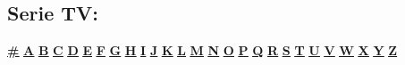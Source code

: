 \subsection [Serie TV]{\huge Serie TV:}
	
		\begin{center}
			\hyperlink{S\#}{\textbf{\underline{\#}}}
			\hyperlink{SA}{\textbf{\underline{A}}} \hyperlink{SB}{\textbf{\underline{B}}} \hyperlink{SC}{\textbf{\underline{C}}} \hyperlink{SD}{\textbf{\underline{D}}} \hyperlink{SE}{\textbf{\underline{E}}} \hyperlink{SF}{\textbf{\underline{F}}} \hyperlink{SG}{\textbf{\underline{G}}} \hyperlink{SH}{\textbf{\underline{H}}} \hyperlink{SI}{\textbf{\underline{I}}} \hyperlink{SJ}{\textbf{\underline{J}}} \hyperlink{SK}{\textbf{\underline{K}}} \hyperlink{SL}{\textbf{\underline{L}}} \hyperlink{SM}{\textbf{\underline{M}}} \hyperlink{SN}{\textbf{\underline{N}}} \hyperlink{SO}{\textbf{\underline{O}}} \hyperlink{SP}{\textbf{\underline{P}}} \hyperlink{SQ}{\textbf{\underline{Q}}} \hyperlink{SR}{\textbf{\underline{R}}} \hyperlink{SS}{\textbf{\underline{S}}} \hyperlink{ST}{\textbf{\underline{T}}} \hyperlink{SU}{\textbf{\underline{U}}} \hyperlink{SV}{\textbf{\underline{V}}} \hyperlink{SW}{\textbf{\underline{W}}} \hyperlink{SX}{\textbf{\underline{X}}} \hyperlink{SY}{\textbf{\underline{Y}}} \hyperlink{SZ}{\textbf{\underline{Z}}}
		\end{center}
	
